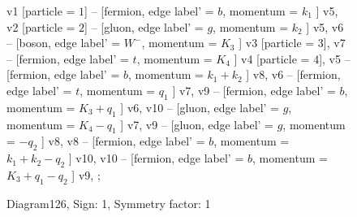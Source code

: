 \documentclass{revtex4}
\begin{document}
\begin{figure}[!htb]
\begin{center}
{    %
v1 [particle = \(1\)] -- [fermion, edge label' = \(b\), momentum = \(k_{1}\) ] v5, 
v2 [particle = \(2\)] -- [gluon, edge label' = \(g\), momentum = \(k_{2}\) ] v5, 
v6 -- [boson, edge label' = \(W^{-}\), momentum = \(K_{3}\) ] v3 [particle = \(3\)], 
v7 -- [fermion, edge label' = \(t\), momentum = \(K_{4}\) ] v4 [particle = \(4\)], 
v5 -- [fermion, edge label' = \(b\), momentum = \(k_{1} + k_{2}\) ] v8, 
v6 -- [fermion, edge label' = \(t\), momentum = \(q_{1}\) ] v7, 
v9 -- [fermion, edge label' = \(b\), momentum = \(K_{3} + q_{1}\) ] v6, 
v10 -- [gluon, edge label' = \(g\), momentum = \(K_{4} - q_{1}\) ] v7, 
v9 -- [gluon, edge label' = \(g\), momentum = \(-q_{2}\) ] v8, 
v8 -- [fermion, edge label' = \(b\), momentum = \(k_{1} + k_{2} - q_{2}\) ] v10, 
v10 -- [fermion, edge label' = \(b\), momentum = \(K_{3} + q_{1} - q_{2}\) ] v9, 
};
\end{center}
\caption{Diagram126, Sign: 1, Symmetry factor: 1}
\end{figure}
\newpage
\end{document}
